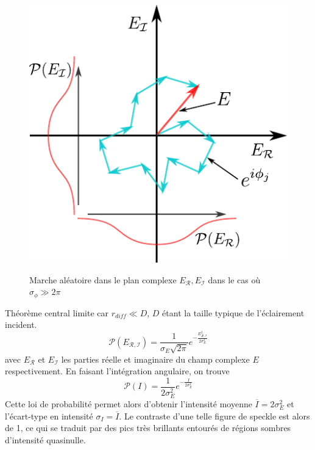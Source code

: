 \begin{figure}
\centering
\includegraphics[scale=1]{Fig/Speckle/random_walk_speckle.pdf}
\label{fig:random_walk_speckle}
\caption{Marche aléatoire dans le plan complexe $E_{\mathcal{R}},E_{\mathcal{I}}$ dans le cas où $\sigma_{\phi} \gg 2\pi$}
\end{figure}
Théorème central limite car $r_{diff} \ll D$, $D$ étant la taille typique de l'éclairement incident.
\begin{equation}
\mathcal{P}(E_{\mathcal{R,I}})=\frac{1}{\sigma_E\sqrt{2\pi}} e^{-\frac{E_{\mathcal{R,I}}^2}{2 \sigma_E^2}}
\end{equation}
avec $E_{\mathcal{R}}$ et $E_{\mathcal{I}}$ les parties réelle et imaginaire du champ complexe $E$ respectivement. En faisant l'intégration angulaire, on trouve 
\begin{equation}
\mathcal{P}(I)=\frac{1}{2\sigma_E^2}e^{-\frac{I}{2\sigma_E^2}}
\end{equation}
Cette loi de probabilité permet alors d'obtenir l'intensité moyenne $\overline{I}=2\sigma_E^2$ et l'écart-type en intensité $\sigma_I=\overline{I}$. Le contraste d'une telle figure de speckle est alors de 1, ce qui se traduit par des pics très brillants entourés de régions sombres d'intensité quasinulle.


